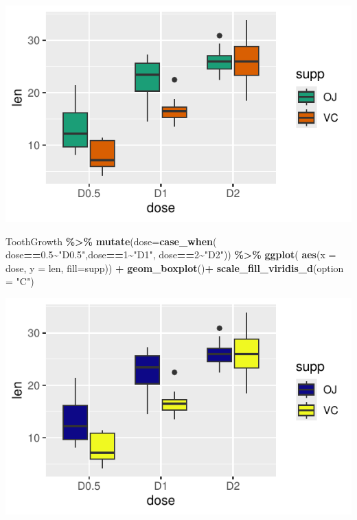 \documentclass[
]{book}
\newenvironment{Shaded}{\begin{snugshade}}{\end{snugshade}}
\newcommand{\AttributeTok}[1]{\textcolor[rgb]{0.13,0.29,0.53}{#1}}
\newcommand{\DecValTok}[1]{\textcolor[rgb]{0.00,0.00,0.81}{#1}}
\newcommand{\FloatTok}[1]{\textcolor[rgb]{0.00,0.00,0.81}{#1}}
\newcommand{\FunctionTok}[1]{\textcolor[rgb]{0.13,0.29,0.53}{\textbf{#1}}}
\newcommand{\NormalTok}[1]{#1}
\newcommand{\SpecialCharTok}[1]{\textcolor[rgb]{0.81,0.36,0.00}{\textbf{#1}}}
\newcommand{\StringTok}[1]{\textcolor[rgb]{0.31,0.60,0.02}{#1}}
\begin{document}
\begin{center}\includegraphics{_main_files/figure-latex/unnamed-chunk-215-1} \end{center}

\begin{Shaded}
\begin{Highlighting}[]
\NormalTok{ToothGrowth }\SpecialCharTok{\%\textgreater{}\%}  \FunctionTok{mutate}\NormalTok{(}\AttributeTok{dose=}\FunctionTok{case\_when}\NormalTok{(}
\NormalTok{  dose}\SpecialCharTok{==}\FloatTok{0.5}\SpecialCharTok{\textasciitilde{}}\StringTok{"D0.5"}\NormalTok{,dose}\SpecialCharTok{==}\DecValTok{1}\SpecialCharTok{\textasciitilde{}}\StringTok{"D1"}\NormalTok{, dose}\SpecialCharTok{==}\DecValTok{2}\SpecialCharTok{\textasciitilde{}}\StringTok{"D2"}\NormalTok{)) }\SpecialCharTok{\%\textgreater{}\%} \FunctionTok{ggplot}\NormalTok{(}
    \FunctionTok{aes}\NormalTok{(}\AttributeTok{x =}\NormalTok{ dose, }\AttributeTok{y =}\NormalTok{ len, }\AttributeTok{fill=}\NormalTok{supp)) }\SpecialCharTok{+}  \FunctionTok{geom\_boxplot}\NormalTok{()}\SpecialCharTok{+}
  \FunctionTok{scale\_fill\_viridis\_d}\NormalTok{(}\AttributeTok{option =} \StringTok{"C"}\NormalTok{)}
\end{Highlighting}
\end{Shaded}

\begin{center}\includegraphics{_main_files/figure-latex/unnamed-chunk-215-2} \end{center}
\end{document}

